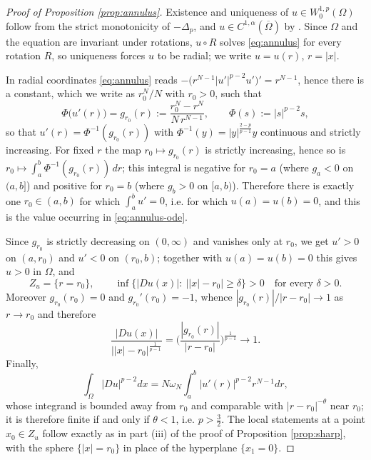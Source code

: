 \documentclass[reqno]{amsart}
\theoremstyle{plain}
\theoremstyle{definition}
\theoremstyle{remark}
\newcommand{\Lap}[1]{\Delta_{#1}}
\begin{document}
\begin{proof}[Proof of Proposition \ref{prop:annulus}]
Existence and uniqueness of $u\in W^{1,p}_0(\Omega)$ follow from the strict monotonicity of
$-\Lap{p}$, and $u\in C^{1,\alpha}(\overline\Omega)$ by \cite{Lie}. Since $\Omega$ and the equation
are invariant under rotations, $u\circ R$ solves \eqref{eq:annulus} for every rotation $R$, so
uniqueness forces $u$ to be radial; we write $u=u(r)$, $r=|x|$.

In radial coordinates \eqref{eq:annulus} reads $-\big(r^{N-1}|u'|^{p-2}u'\big)'=r^{N-1}$, hence
there is a constant, which we write as $r_0^N/N$ with $r_0>0$, such that
\begin{equation}\label{eq:annulus-ode}
\Phi\big(u'(r)\big)=g_{r_0}(r):=\frac{r_0^{N}-r^{N}}{N\,r^{N-1}},\qquad
\Phi(s):=|s|^{p-2}s ,
\end{equation}
so that $u'(r)=\Phi^{-1}(g_{r_0}(r))$ with $\Phi^{-1}(y)=|y|^{\frac{2-p}{p-1}}y$ continuous and
strictly increasing. For fixed $r$ the map $r_0\mapsto g_{r_0}(r)$ is strictly increasing, hence so
is $r_0\mapsto\int_a^b\Phi^{-1}(g_{r_0}(r))\,dr$; this integral is negative for $r_0=a$ (where
$g_a<0$ on $(a,b]$) and positive for $r_0=b$ (where $g_b>0$ on $[a,b)$). Therefore there is exactly
one $r_0\in(a,b)$ for which $\int_a^bu'=0$, i.e. for which $u(a)=u(b)=0$, and this is the value
occurring in \eqref{eq:annulus-ode}.

Since $g_{r_0}$ is strictly decreasing on $(0,\infty)$ and vanishes only at $r_0$, we get $u'>0$ on
$(a,r_0)$ and $u'<0$ on $(r_0,b)$; together with $u(a)=u(b)=0$ this gives $u>0$ in $\Omega$, and
\[
Z_u=\{r=r_0\},\qquad
\inf\big\{|Du(x)|:\ \big||x|-r_0\big|\ge\delta\big\}>0\quad\text{for every }\delta>0 .
\]
Moreover $g_{r_0}(r_0)=0$ and $g_{r_0}'(r_0)=-1$, whence $|g_{r_0}(r)|/|r-r_0|\to1$ as $r\to r_0$
and therefore
\[
\frac{|Du(x)|}{\big||x|-r_0\big|^{\frac1{p-1}}}
=\Big(\frac{|g_{r_0}(r)|}{|r-r_0|}\Big)^{\frac1{p-1}}\longrightarrow 1 .
\]
Finally,
\[
\int_\Omega|Du|^{p-2}dx=N\omega_N\int_a^b|u'(r)|^{p-2}r^{N-1}dr ,
\]
whose integrand is bounded away from $r_0$ and comparable with $|r-r_0|^{-\theta}$ near $r_0$; it is
therefore finite if and only if $\theta<1$, i.e. $p>\frac32$. The local statements at a point
$x_0\in Z_u$ follow exactly as in part (iii) of the proof of Proposition \ref{prop:sharp}, with the
sphere $\{|x|=r_0\}$ in place of the hyperplane $\{x_1=0\}$.
\end{proof}
\end{document}
